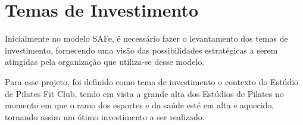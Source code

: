 \section[Temas de Investimento]{Temas de Investimento}

Inicialmente no modelo SAFe, é necessário fazer o levantamento dos temas de investimento, fornecendo uma visão das possibilidades estratégicas a serem atingidas pela organização que utiliza-se desse modelo.

Para esse projeto, foi definido como tema de investimento o contexto do Estúdio de Pilates Fit Club, tendo em vista a grande alta dos Estúdios de Pilates no momento em que o ramo dos esportes e da saúde esté em alta e aquecido, tornando assim um ótimo investimento a ser realizado.